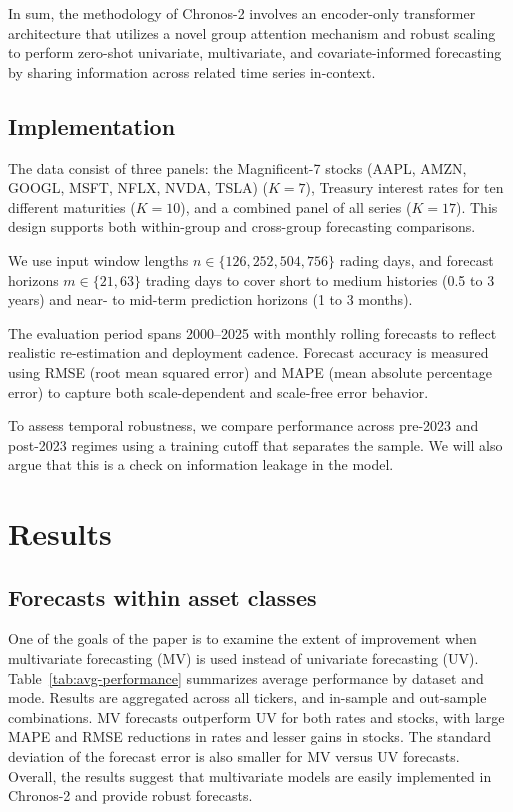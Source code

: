 \documentclass[twocolumn]{article}
\begin{document}
In sum, the methodology of Chronos-2 involves an encoder-only transformer architecture that utilizes a novel group attention mechanism and robust scaling to perform zero-shot univariate, multivariate, and covariate-informed forecasting by sharing information across related time series in-context.

\subsection{Implementation}

The data consist of three panels: the Magnificent-7 stocks (AAPL, AMZN, GOOGL, MSFT, NFLX, NVDA, TSLA) ($K=7$), Treasury interest rates for ten different maturities ($K=10$), and a combined panel of all series ($K=17$). This design supports both within-group and cross-group forecasting comparisons.

We use input window lengths $n \in \{126, 252, 504, 756\}$ rading days, and forecast horizons $m \in \{21, 63\}$ trading days to cover short to medium histories (0.5 to 3 years) and near- to mid-term prediction horizons (1 to 3 months).

The evaluation period spans 2000--2025 with monthly rolling forecasts to reflect realistic re-estimation and deployment cadence. Forecast accuracy is measured using RMSE (root mean squared error) and MAPE (mean absolute percentage error) to capture both scale-dependent and scale-free error behavior. 

To assess temporal robustness, we compare performance across pre-2023 and post-2023 regimes using a training cutoff that separates the sample. We will also argue that this is a check on information leakage in the model. 

\section{Results}

\subsection{Forecasts within asset classes}

One of the goals of the paper is to examine the extent of improvement when multivariate forecasting (MV) is used instead of univariate forecasting (UV). Table~\ref{tab:avg-performance} summarizes average performance by dataset and mode. Results are aggregated across all tickers, and in-sample and out-sample combinations. MV forecasts outperform UV for both rates and stocks, with large MAPE and RMSE reductions in rates and lesser gains in stocks. The standard deviation of the forecast error is also smaller for MV versus UV forecasts. Overall, the results suggest that multivariate models are easily implemented in Chronos-2 and provide robust forecasts. 
\end{document}
